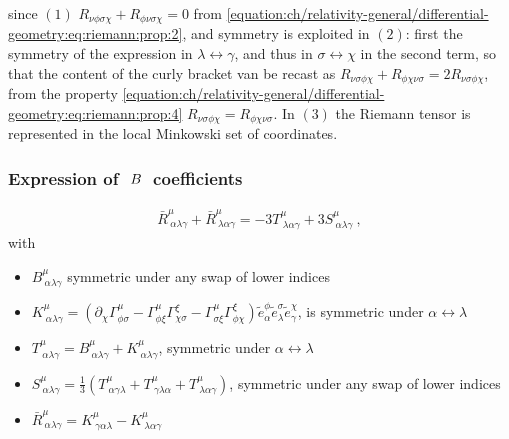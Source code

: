 \documentclass[letterpaper,10pt,english]{jupyterBook}
\begin{document}
\sphinxAtStartPar
since \((1)\) \( R_{\nu \phi \sigma \chi} + R_{\phi \nu \sigma \chi} = 0\) from \eqref{equation:ch/relativity-general/differential-geometry:eq:riemann:prop:2}, and symmetry is exploited in \((2)\): first the symmetry of the expression in \(\lambda \leftrightarrow \gamma\), and thus in \(\sigma \leftrightarrow \chi\) in the second term, so that the content of the curly bracket van be recast as \(R_{\nu \sigma \phi \chi} + R_{\phi \chi \nu \sigma} = 2 R_{\nu \sigma \phi \chi}\), from the property \eqref{equation:ch/relativity-general/differential-geometry:eq:riemann:prop:4} \(R_{\nu \sigma \phi \chi} = R_{\phi \chi \nu \sigma}\). In \((3)\) the Riemann tensor is represented in the local Minkowski set of coordinates.
\subsubsection*{Expression of \protect\(\ B\ \protect\) coefficients}
\begin{equation*}
\begin{split}
\bar{R}^{\mu}_{\  \alpha \lambda \gamma} + \bar{R}^{\mu}_{\ \lambda \alpha \gamma} =
- 3 T^{\mu}_{\ \lambda \alpha \gamma} + 3 S^{\mu}_{\ \alpha \lambda \gamma} \ ,
\end{split}
\end{equation*}
\sphinxAtStartPar
with
\begin{itemize}
\item {} 
\sphinxAtStartPar
\(B^{\mu}_{\ \alpha \lambda \gamma}\) symmetric under any swap of lower indices

\item {} 
\sphinxAtStartPar
\(K^{\mu}_{\ \alpha \lambda \gamma} = \left( \partial_{\chi} \Gamma^{\mu}_{\phi \sigma} - \Gamma^{\mu}_{\phi \xi} \Gamma^{\xi}_{\chi \sigma} - \Gamma^{\mu}_{\sigma \xi} \Gamma^{\xi}_{\phi \chi} \right) \widetilde{e}^{\phi}_{\alpha} \widetilde{e}^{\sigma}_{\lambda} \widetilde{e}^{\chi}_{\gamma}\), is symmetric under \(\alpha \leftrightarrow \lambda\)

\item {} 
\sphinxAtStartPar
\(T^{\mu}_{\ \alpha \lambda \gamma} = B^{\mu}_{\ \alpha \lambda \gamma} + K^{\mu}_{\ \alpha \lambda \gamma}\), symmetric under \(\alpha \leftrightarrow \lambda\)

\item {} 
\sphinxAtStartPar
\(S^{\mu}_{\ \alpha \lambda \gamma} = \frac{1}{3} \left( T^{\mu}_{\ \alpha \gamma \lambda} + T^{\mu}_{\ \gamma \lambda \alpha} + T^{\mu}_{\ \lambda \alpha \gamma} \right)\), symmetric under any swap of lower indices

\item {} 
\sphinxAtStartPar
\(\bar{R}^{\mu}_{\ \alpha \lambda \gamma} = K^{\mu}_{\ \gamma \alpha \lambda} - K^{\mu}_{\ \lambda \alpha \gamma}\)

\end{itemize}
\end{document}
